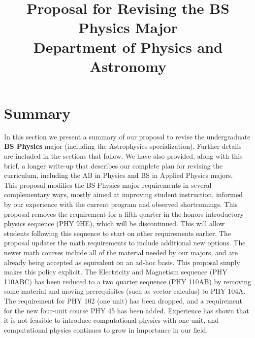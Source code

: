 \documentclass[12pt]{article}
\begin{document}
\title{Proposal for Revising the BS Physics Major \\
Department of Physics and Astronomy}

\maketitle

\section*{Summary}

\noindent
In this section we present a summary of our proposal to revise the
undergraduate {\bf BS Physics} major (including the Astrophysics
specialization).  Further details are included in the sections that
follow.  We have also provided, along with this brief, a longer
write-up that describes our complete plan for revising the curriculum,
including the AB in Physics and BS in Applied Physics majors.\\[5pt]

\noindent
This proposal modifies the BS Physics major requirements in several
complementary ways, mostly aimed at improving student instruction,
informed by our experience with the current program and observed
shortcomings.  This proposal removes the requirement for a fifth
quarter in the honors introductory physics sequence (PHY 9HE), which
will be discontinued.  This will allow students following this
sequence to start on other requirements earlier.  The proposal updates
the math requirements to include additional new options.  The newer
math courses include all of the material needed by our majors, and are
already being accepted as equivalent on an ad-hoc basis.  This
proposal simply makes this policy explicit.  The Electricity and
Magnetism sequence (PHY 110ABC) has been reduced to a two quarter
sequence (PHY 110AB) by removing some material and moving prerequisites
(such as vector calculus) to PHY 104A.  The requirement for PHY 102
(one unit) has been dropped, and a requirement for the new four-unit
course PHY 45 has been added.  Experience has shown that it is not
feasible to introduce computational physics with one unit, and
computational physics continues to grow in importance in our
field.\\[5pt]
\end{document}
